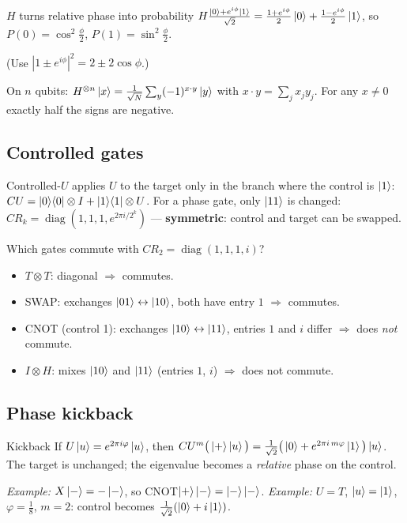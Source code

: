 \documentclass[11pt,a4paper,openany]{book}
\newcounter{wex}[chapter]
\begin{document}
\begin{keyres}{$H$ turns relative phase into probability}
$H\frac{\ket0 + e^{i\phi}\ket1}{\sqrt2} = \frac{1 + e^{i\phi}}{2}\ket0 + \frac{1 - e^{i\phi}}{2}\ket1$, so $P(0) = \cos^2\frac\phi2$, $P(1) = \sin^2\frac\phi2$.
\end{keyres}
(Use $|1 \pm e^{i\phi}|^2 = 2 \pm 2\cos\phi$.)

On $n$ qubits: $H^{\otimes n}\ket{x} = \frac{1}{\sqrt N}\sum_y(-1)^{x\cdot y}\ket y$ with $x\cdot y = \sum_j x_jy_j$. For any $x \ne 0$ exactly half the signs
are negative.

\subsection{Controlled gates}
Controlled-$U$ applies $U$ to the target only in the branch where the control is $\ket1$:
$CU = \ket0\!\bra0\otimes I + \ket1\!\bra1\otimes U$. For a phase gate, only $\ket{11}$ is changed:
$CR_k = \operatorname{diag}(1, 1, 1, e^{2\pi i/2^k})$ --- \textbf{symmetric}: control and target can be swapped.

\begin{wexample}{Which gates commute with $CR_2 = \operatorname{diag}(1,1,1,i)$?}
\begin{itemize}[itemsep=1pt]
\item $T\otimes T$: diagonal $\Rightarrow$ commutes.
\item SWAP: exchanges $\ket{01}\leftrightarrow\ket{10}$, both have entry $1$ $\Rightarrow$ commutes.
\item CNOT (control 1): exchanges $\ket{10}\leftrightarrow\ket{11}$, entries $1$ and $i$ differ $\Rightarrow$ does \emph{not} commute.
\item $I\otimes H$: mixes $\ket{10}$ and $\ket{11}$ (entries $1$, $i$) $\Rightarrow$ does not commute.
\end{itemize}
\end{wexample}

\subsection{Phase kickback}
\begin{keyres}{Kickback}
If $U\ket u = e^{2\pi i\varphi}\ket u$, then $CU^{m}\big(\ket+\ket u\big) = \frac{1}{\sqrt2}\big(\ket0 + e^{2\pi i\,m\varphi}\ket1\big)\ket u$.
The target is unchanged; the eigenvalue becomes a \emph{relative} phase on the control.
\end{keyres}
\emph{Example:} $X\ket- = -\ket-$, so CNOT$\ket+\ket- = \ket-\ket-$. \emph{Example:} $U = T$, $\ket u = \ket1$, $\varphi = \frac18$, $m = 2$:
control becomes $\frac{1}{\sqrt2}(\ket0 + i\ket1)$.
\end{document}
